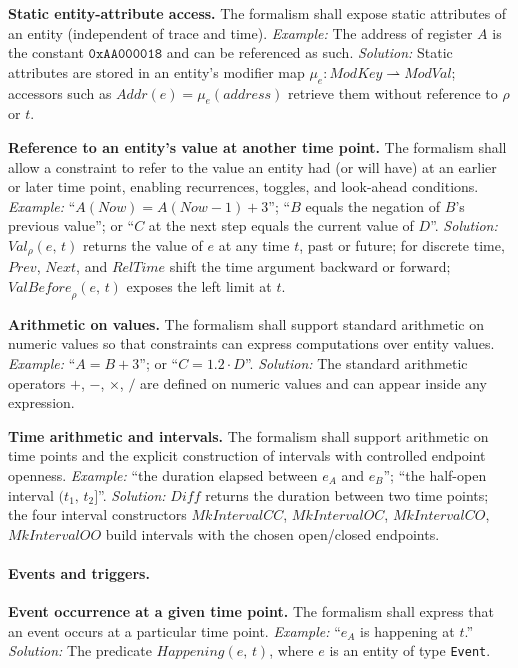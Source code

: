 \textbf{Static entity-attribute access.} The formalism shall expose static attributes of an entity (independent of trace and time). \textit{Example:} The address of register $A$ is the constant $\mathtt{0xAA000018}$ and can be referenced as such. \textit{Solution:} Static attributes are stored in an entity's modifier map $\mu_e : \mathit{ModKey} \rightharpoonup \mathit{ModVal}$; accessors such as $\mathit{Addr}(e) = \mu_e(\mathit{address})$ retrieve them without reference to $\rho$ or $t$.

\textbf{Reference to an entity's value at another time point.} The formalism shall allow a constraint to refer to the value an entity had (or will have) at an earlier or later time point, enabling recurrences, toggles, and look-ahead conditions. \textit{Example:} ``$A(\mathit{Now}) = A(\mathit{Now}-1) + 3$''; ``$B$ equals the negation of $B$'s previous value''; or ``$C$ at the next step equals the current value of $D$''. \textit{Solution:} $\mathit{Val}_\rho(e,\, t)$ returns the value of $e$ at any time $t$, past or future; for discrete time, $\mathit{Prev}$, $\mathit{Next}$, and $\mathit{RelTime}$ shift the time argument backward or forward; $\mathit{ValBefore}_\rho(e,\, t)$ exposes the left limit at $t$.

\textbf{Arithmetic on values.} The formalism shall support standard arithmetic on numeric values so that constraints can express computations over entity values. \textit{Example:} ``$A = B + 3$''; or ``$C = 1.2 \cdot D$''. \textit{Solution:} The standard arithmetic operators $+$, $-$, $\times$, $/$ are defined on numeric values and can appear inside any expression.

\textbf{Time arithmetic and intervals.} The formalism shall support arithmetic on time points and the explicit construction of intervals with controlled endpoint openness. \textit{Example:} ``the duration elapsed between $e_A$ and $e_B$''; ``the half-open interval $(t_1,\, t_2]$''. \textit{Solution:} $\mathit{Diff}$ returns the duration between two time points; the four interval constructors $\mathit{MkIntervalCC}$, $\mathit{MkIntervalOC}$, $\mathit{MkIntervalCO}$, $\mathit{MkIntervalOO}$ build intervals with the chosen open/closed endpoints.

\paragraph{Events and triggers.}

\textbf{Event occurrence at a given time point.} The formalism shall express that an event occurs at a particular time point. \textit{Example:} ``$e_A$ is happening at $t$.'' \textit{Solution:} The predicate $\mathit{Happening}(e,\, t)$, where $e$ is an entity of type \texttt{Event}.

